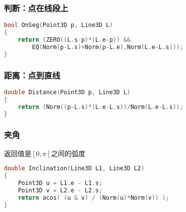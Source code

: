 	\subsubsection{判断：点在线段上}
		\begin{lstlisting}[language=c++]
bool OnSeg(Point3D p, Line3D L)
{ 
	return (ZERO((L.s-p)*(L.e-p)) && 
		EQ(Norm(p-L.s)+Norm(p-L.e),Norm(L.e-L.s))); 
} 
		\end{lstlisting}
		
	\subsubsection{距离：点到直线}
		\begin{lstlisting}[language=c++]
double Distance(Point3D p, Line3D L)
{ 
	return (Norm((p-L.s)*(L.e-L.s))/Norm(L.e-L.s)); 
} 
		\end{lstlisting}

	\subsubsection{夹角}
		返回值是$[0,\pi]$之间的弧度
		\begin{lstlisting}[language=c++]
double Inclination(Line3D L1, Line3D L2) 
{ 
	Point3D u = L1.e - L1.s; 
	Point3D v = L2.e - L2.s; 
	return acos( (u & v) / (Norm(u)*Norm(v)) ); 
} 
		\end{lstlisting}
